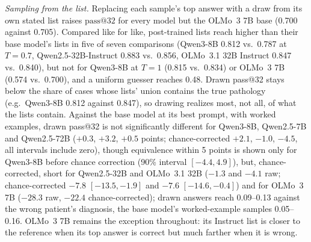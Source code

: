 \documentclass[11pt]{article}
\makeatletter
\newcommand{\passk}[1]{\mathrm{pass@}#1}
\makeatother
\begin{document}
\emph{Sampling from the list.} Replacing each sample's top answer with a draw from its own stated list raises $\passk{32}$ for every model but the OLMo~3 7B base (0.700 against 0.705). Compared like for like, post-trained lists reach higher than their base model's lists in five of seven comparisons (Qwen3-8B 0.812 vs.\ 0.787 at $T{=}0.7$, Qwen2.5-32B-Instruct 0.883 vs.\ 0.856, OLMo~3.1 32B Instruct 0.847 vs.\ 0.840), but not for Qwen3-8B at $T{=}1$ (0.815 vs.\ 0.834) or OLMo~3 7B (0.574 vs.\ 0.700), and a uniform guesser reaches 0.48. Drawn pass@32 stays below the share of cases whose lists' union contains the true pathology (e.g.\ Qwen3-8B 0.812 against 0.847), so drawing realizes most, not all, of what the lists contain. Against the base model at its best prompt, with worked examples, drawn pass@32 is not significantly different for Qwen3-8B, Qwen2.5-7B and Qwen2.5-72B ($+0.3$, $+3.2$, $+0.5$ points; chance-corrected $+2.1$, $-1.0$, $-4.5$, all intervals include zero), though equivalence within 5 points is shown only for Qwen3-8B before chance correction (90\% interval $[-4.4,4.9]$), but, chance-corrected, short for Qwen2.5-32B and OLMo~3.1 32B ($-1.3$ and $-4.1$ raw; chance-corrected $-7.8$ $[-13.5,-1.9]$ and $-7.6$ $[-14.6,-0.4]$) and for OLMo~3 7B ($-28.3$ raw, $-22.4$ chance-corrected); drawn answers reach 0.09--0.13 against the wrong patient's diagnosis, the base model's worked-example samples 0.05--0.16.
OLMo~3 7B remains the exception throughout: its Instruct list is closer to the reference when its top answer is correct but much farther when it is wrong.
\end{document}
